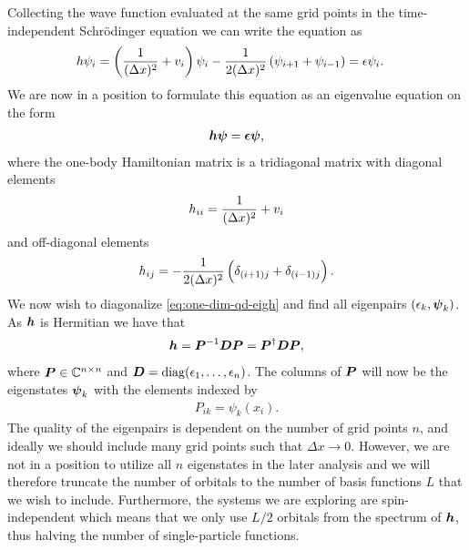         Collecting the wave function evaluated at the same grid points in the
        time-independent Schrödinger equation we can write the equation as
        \begin{align}
            h \psi_i
            &=
            \left( 
                \frac{1}{(\Delta x)^2}
                + v_i
             \right)\psi_i
            - \frac{1}{2 (\Delta x)^2}
            \left( 
                \psi_{i + 1}
                + \psi_{i - 1}
             \right)
            = \epsilon \psi_i.
        \end{align}
        We are now in a position to formulate this equation as an eigenvalue
        equation on the form
        \begin{align}
            \boldsymbol{h}\boldsymbol{\psi}
            = \boldsymbol{\epsilon}\boldsymbol{\psi},
            \label{eq:one-dim-qd-eigh}
        \end{align}
        where the one-body Hamiltonian matrix is a tridiagonal matrix with
        diagonal elements
        \begin{align}
            h_{ii}
            =
            \frac{1}{(\Delta x)^2}
            + v_i
        \end{align}
        and off-diagonal elements
        \begin{align}
            h_{ij}
            = -\frac{1}{2(\Delta x)^2}\left( 
                \delta_{(i + 1) j}
                + \delta_{(i - 1) j}
             \right).
        \end{align}
        We now wish to diagonalize \autoref{eq:one-dim-qd-eigh} and find all
        eigenpairs $(\epsilon_k, \boldsymbol{\psi}_k)$.
        As $\boldsymbol{h}$ is Hermitian we have that \cite{mat-inf4130}
        \begin{align}
            \boldsymbol{h} = \boldsymbol{P}^{-1}\boldsymbol{D}\boldsymbol{P}
            = \boldsymbol{P}^{\dagger}\boldsymbol{D}\boldsymbol{P},
        \end{align}
        where $\boldsymbol{P} \in \mathbb{C}^{n \times n}$ and $\boldsymbol{D} = \operatorname{diag}(\epsilon_1,
        \dots, \epsilon_n)$.
        The columns of $\boldsymbol{P}$ will now be the eigenstates $\boldsymbol{\psi}_k$ with
        the elements indexed by
        \begin{align}
            P_{ik} = \psi_k(x_i).
        \end{align}
        The quality of the eigenpairs is dependent on the number of grid points
        $n$, and ideally we should include many grid points such that $\Delta x
        \to 0$.
        However, we are not in a position to utilize all $n$ eigenstates in the
        later analysis and we will therefore truncate the number of orbitals to
        the number of basis functions $L$ that we wish to include.
        Furthermore, the systems we are exploring are spin-independent which
        means that we only use $L / 2$ orbitals from the spectrum of $\boldsymbol{h}$,
        thus halving the number of single-particle functions.

